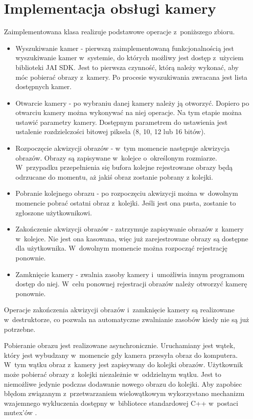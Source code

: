 \section{Implementacja obsługi kamery}
\label{sec:implementacjaKamery}

Zaimplementowana klasa realizuje podstawowe operacje z~poniższego zbioru. 
\begin{itemize}
\item Wyszukiwanie kamer - pierwszą zaimplementowaną funkcjonalnością jest wyszukiwanie kamer w~systemie, do których możliwy jest dostęp z~użyciem biblioteki JAI SDK. Jest to pierwsza czynność, którą należy wykonać, aby móc pobierać obrazy z~kamery. Po procesie wyszukiwania zwracana jest lista dostępnych kamer.
\item Otwarcie kamery - po wybraniu danej kamery należy ją otworzyć. Dopiero po otwarciu kamery można wykonywać na niej operacje. Na tym etapie można ustawić parametry kamery. Dostępnym parametrem do ustawienia jest ustalenie rozdzielczości bitowej piksela (8, 10, 12 lub 16 bitów).
\item Rozpoczęcie akwizycji obrazów - w~tym momencie następuje akwizycja obrazów. Obrazy są zapisywane w~kolejce o~określonym rozmiarze. W~przypadku przepełnienia się bufora kolejne rejestrowane obrazy będą odrzucane do momentu, aż jakiś obraz zostanie pobrany z kolejki.
\item Pobranie kolejnego obrazu - po rozpoczęciu akwizycji można w~dowolnym momencie pobrać ostatni obraz z~kolejki. Jeśli jest ona pusta, zostanie to zgłoszone użytkownikowi.
\item Zakończenie akwizycji obrazów - zatrzymuje zapisywanie obrazów z~kamery w~kolejce. Nie jest ona kasowana, więc już zarejestrowane obrazy są dostępne dla użytkownika. W~dowolnym momencie można rozpocząć rejestrację ponownie.
\item Zamknięcie kamery - zwalnia zasoby kamery i~umożliwia innym programom dostęp do niej. W~celu ponownej rejestracji obrazów należy otworzyć kamerę ponownie.
\end{itemize}
Operacje zakończenia akwizycji obrazów i~zamknięcie kamery są realizowane w~destruktorze, co pozwala na automatyczne zwalnianie zasobów kiedy nie są już potrzebne.

Pobieranie obrazu jest realizowane asynchronicznie. Uruchamiany jest wątek, który jest wybudzany w~momencie gdy kamera przesyła obraz do komputera. W~tym wątku obraz z~kamery jest zapisywany do kolejki obrazów. Użytkownik może pobierać obrazy z~kolejki niezależnie w~oddzielnym wątku. Jest to niemożliwe jedynie podczas dodawanie nowego obrazu do kolejki. Aby zapobiec błędom związanym z~przetwarzaniem wielowątkowym wykorzystano mechanizm wzajemnego wykluczenia dostępny w~bibliotece standardowej C++ w~postaci mutex'ów \cite{mutexCpp}.